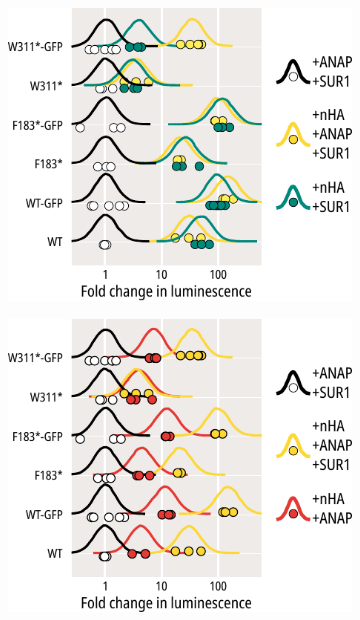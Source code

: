 \begin{figure}[hbtp]
	\centering
	\begin{subfigure}[t]{0.45\textwidth}
		\caption{}\label{ch3fig:surface_expression_1}
		\centering
		\includegraphics[width=\textwidth]{surface_expression_1.pdf}
	\end{subfigure}
	\hfill
	\begin{subfigure}[t]{0.45\textwidth}
		\caption{}\label{ch3fig:surface_expression_2}
		\centering
		\includegraphics[width=\textwidth]{surface_expression_2.pdf}

\end{subfigure}
\end{figure}
